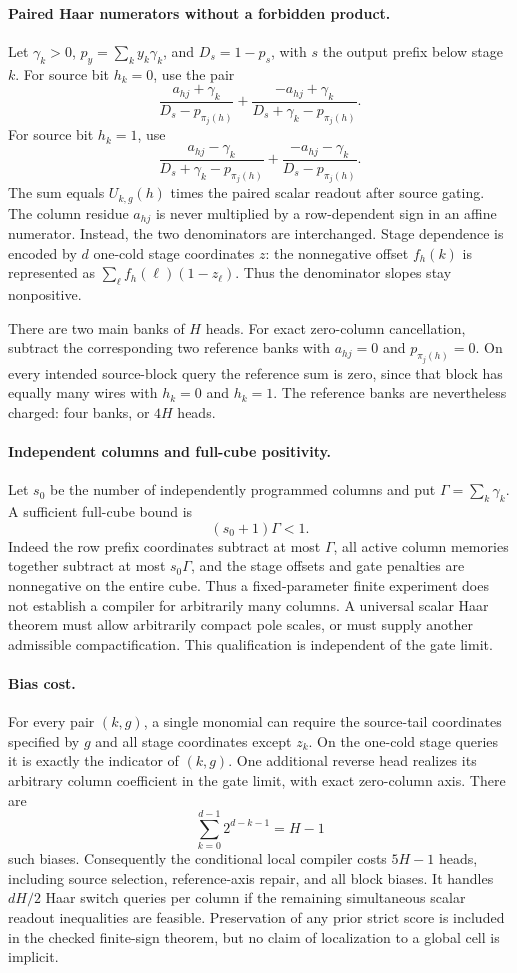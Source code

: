 \documentclass{article}
\begin{document}
\paragraph{Paired Haar numerators without a forbidden product.}
Let $\gamma_k>0$, $p_y=\sum_k y_k\gamma_k$, and
$D_s=1-p_s$, with $s$ the output prefix below stage $k$.
For source bit $h_k=0$, use the pair
\[
 \frac{a_{hj}+\gamma_k}{D_s-p_{\pi_j(h)}}+
 \frac{-a_{hj}+\gamma_k}{D_s+\gamma_k-p_{\pi_j(h)}}.
\]
For source bit $h_k=1$, use
\[
 \frac{a_{hj}-\gamma_k}{D_s+\gamma_k-p_{\pi_j(h)}}+
 \frac{-a_{hj}-\gamma_k}{D_s-p_{\pi_j(h)}}.
\]
The sum equals $U_{k,g}(h)$ times the paired scalar readout after
source gating.  The column residue $a_{hj}$ is never multiplied by a
row-dependent sign in an affine numerator.  Instead, the two denominators
are interchanged.  Stage dependence is encoded by $d$ one-cold stage
coordinates $z$: the nonnegative offset $f_h(k)$ is represented as
$\sum_\ell f_h(\ell)(1-z_\ell)$.  Thus the denominator slopes stay
nonpositive.

There are two main banks of $H$ heads.  For exact zero-column cancellation,
subtract the corresponding two reference banks with $a_{hj}=0$ and
$p_{\pi_j(h)}=0$.  On every intended source-block query the reference sum
is zero, since that block has equally many wires with $h_k=0$ and $h_k=1$.
The reference banks are nevertheless charged: four banks, or $4H$ heads.

\paragraph{Independent columns and full-cube positivity.}
Let $s_0$ be the number of independently programmed columns and put
$\Gamma=\sum_k\gamma_k$.  A sufficient full-cube bound is
\[
 (s_0+1)\Gamma<1.
\]
Indeed the row prefix coordinates subtract at most $\Gamma$, all active
column memories together subtract at most $s_0\Gamma$, and the stage
offsets and gate penalties are nonnegative on the entire cube.  Thus a
fixed-parameter finite experiment does not establish a compiler for
arbitrarily many columns.  A universal scalar Haar theorem must allow
arbitrarily compact pole scales, or must supply another admissible
compactification.  This qualification is independent of the gate limit.

\paragraph{Bias cost.}
For every pair $(k,g)$, a single monomial can require the source-tail
coordinates specified by $g$ and all stage coordinates except $z_k$.
On the one-cold stage queries it is exactly the indicator of $(k,g)$.
One additional reverse head realizes its arbitrary column coefficient
in the gate limit, with exact zero-column axis.  There are
\[
 \sum_{k=0}^{d-1}2^{d-k-1}=H-1
\]
such biases.  Consequently the conditional local compiler costs
$5H-1$ heads, including source selection, reference-axis repair, and
all block biases.  It handles $dH/2$ Haar switch queries per column if
the remaining simultaneous scalar readout inequalities are feasible.
Preservation of any prior strict score is included in the checked
finite-sign theorem, but no claim of localization to a global cell is
implicit.
\end{document}
